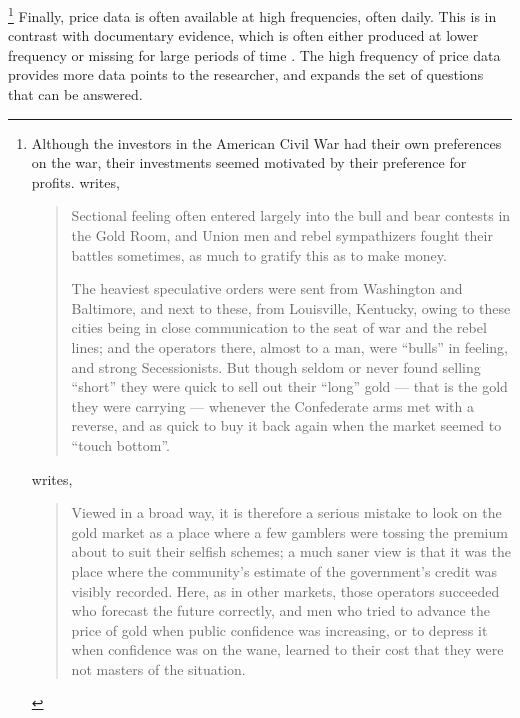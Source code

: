 \footnote{
  Although the investors in the American Civil War had their own preferences on the war, their investments seemed motivated by their preference for profits.
  \textcite[5,7]{Cornwallis1879} writes,
  \begin{quote} 
    Sectional feeling often entered largely into the bull and bear  contests in the Gold Room, and Union men and rebel sympathizers fought their battles sometimes, as much to gratify this as to make money.

    The heaviest speculative orders were sent from Washington and Baltimore, and next to these, from Louisville, Kentucky, owing to these cities being in close communication to the seat of war and the rebel lines; and the operators there, almost to a man, were ``bulls'' in feeling, and strong Secessionists.
    But though seldom or never found selling ``short'' they were quick to sell out their ``long'' gold --- that is the gold they were carrying --- whenever the Confederate arms met with a reverse, and as quick to buy it back again when the market seemed to ``touch bottom''.
  \end{quote}
  \textcite[210]{Mitchell1903} writes,
  \begin{quote}
    Viewed in a broad way, it is therefore a serious mistake to look on the gold market as a place where a few gamblers were tossing the premium about to suit their selfish schemes; a much saner view is that it was the place where the community's estimate of the government's credit was visibly recorded.
    Here, as in other markets, those operators succeeded who forecast the future correctly, and men who tried to advance the price of gold when public confidence was increasing, or to depress it when confidence was on the wane, learned to their cost that they were not masters of the situation.
  \end{quote}
} %
Finally, price data is often available at high frequencies, often daily.
This is in contrast with documentary evidence, which is often either produced at lower frequency or missing for large periods of time \parencite[][57]{Reiter2009}.
The high frequency of price data provides more data points to the researcher, and expands the set of questions that can be answered.

